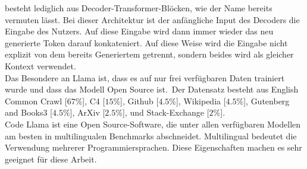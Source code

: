 \documentclass[12pt,letterpaper,ngerman]{article}
\begin{document}
besteht lediglich aus Decoder-Transformer-Blöcken,
wie der Name bereits vermuten lässt. Bei dieser Architektur
ist der anfängliche Input des Decoders die Eingabe des Nutzers.
Auf diese Eingabe wird dann immer wieder das neu generierte Token
darauf konkateniert. Auf diese Weise wird die Eingabe nicht explizit
von dem bereits Generiertem getrennt, sondern beides wird als 
gleicher Kontext verwendet.\\
Das Besondere an Llama ist, dass es auf nur frei verfügbaren
Daten trainiert wurde und dass das Modell Open Source ist. Der
Datensatz besteht aus English Common Crawl [$67\%$],
C4 [$15\%$],  Github [$4.5\%$],
Wikipedia [$4.5\%$], Gutenberg and Books3 [$4.5\%$], 
ArXiv [$2.5\%$], und Stack-Exchange [$2\%$].\\
Code Llama ist eine Open Source-Software, die unter allen 
verfügbaren Modellen am besten in multilingualen Benchmarks 
abschneidet. Multilingual bedeutet die Verwendung mehrerer 
Programmiersprachen. Diese Eigenschaften machen es sehr geeignet
für diese Arbeit.
\end{document}
